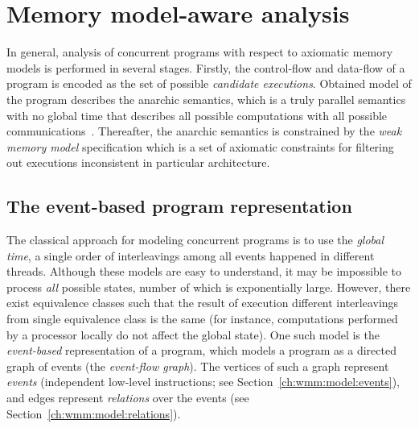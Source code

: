 \chapter{Memory model-aware analysis}%
\label{ch:wmm}

In general, analysis of concurrent programs with respect to axiomatic memory models is performed in several stages. %
Firstly, the control-flow and data-flow of a program is encoded as the set of possible \textit{candidate executions}. %
Obtained model of the program describes the anarchic semantics, which is a truly parallel semantics with no global time that describes all possible computations with all possible communications~\cite{alglave2016syntax}. Thereafter, the anarchic semantics is constrained by the \textit{weak memory model} specification which is a set of axiomatic constraints for filtering out executions inconsistent in particular architecture.


\section{The event-based program representation}
\label{ch:wmm:event}

The classical approach for modeling concurrent programs is to use the \textit{global time}, a single order of interleavings among all events happened in different threads.
Although these models are easy to understand, it may be impossible to process \textit{all} possible states, number of which is exponentially large.
However, there exist equivalence classes such that the result of execution different interleavings from single equivalence class is the same (for instance, computations performed by a processor locally do not affect the global state).
One such model is the \textit{event-based} representation of a program, which models a program as a directed graph of events (the \textit{event-flow graph}).
The vertices of such a graph represent \textit{events} (independent low-level instructions; see Section~\ref{ch:wmm:model:events}), and edges represent \textit{relations} over the events (see Section~\ref{ch:wmm:model:relations}).

